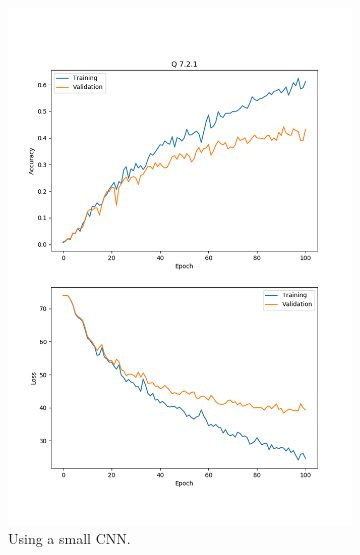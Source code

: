 \documentclass[11pt]{article}
\begin{document}
\begin{figure}[h!]
    \begin{subfigure}{.495\textwidth}
      \centering
      \includegraphics[width=.9\linewidth]{../results/q7_2_1_102_small.png}
      \caption{Using a small CNN. }
    \end{subfigure}
    \begin{subfigure}{.495\textwidth}
      \centering

\end{subfigure}
\end{figure}
\end{document}
